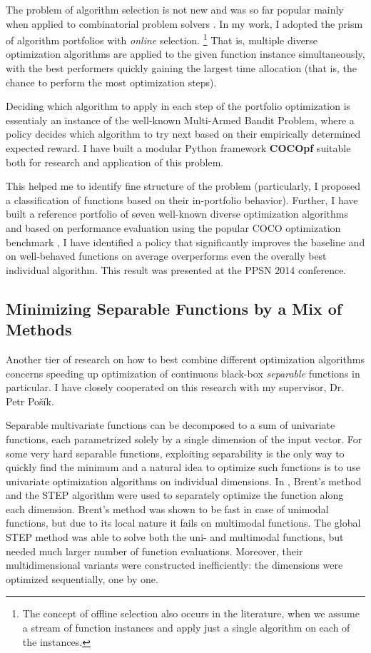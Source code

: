 The problem of algorithm selection is not new \cite{Rice}
and was so far popular mainly when applied to
combinatorial problem solvers \cite{combpfsurvey}.
In my work, I adopted the prism of algorithm portfolios \cite{algportfolios}
with \textit{online} selection.%
\footnote{The concept of offline selection also occurs in the literature,
	when we assume a stream of function instances and apply just a single
	algorithm on each of the instances.}
That is, multiple diverse optimization algorithms are applied
to the given function instance simultaneously, with the best
performers quickly gaining the largest time allocation (that is,
the chance to perform the most optimization steps).

Deciding which algorithm to apply in each step of the portfolio
optimization is essentialy an instance of the well-known Multi-Armed
Bandit Problem, where a policy decides which algorithm to try next
based on their empirically determined expected reward.
I have built a modular Python framework \textbf{COCOpf} \cite{COCOpf}
suitable both for research and application of this problem.

This helped me to identify fine structure of the problem
(particularly, I proposed a classification of functions based on
their in-portfolio behavior).
Further, I have built a reference portfolio of seven well-known
diverse optimization algorithms and based on performance evaluation
using the popular COCO optimization benchmark \cite{COCO1}, I have
identified a policy that significantly improves the baseline and
on well-behaved functions on average overperforms even the overally
best individual algorithm. This result was presented at the
PPSN 2014 conference. \cite{optpf}

\subsection{Minimizing Separable Functions by a Mix of Methods}

Another tier of research on how to best combine different optimization
algorithms concerns speeding up optimization of continuous black-box
\textit{separable} functions in particular.  I have closely cooperated
on this research with my supervisor, Dr. Petr Pošík.

Separable multivariate functions can be decomposed to a sum of univariate
functions, each parametrized solely by a single dimension of the input
vector.
For some very hard separable functions, exploiting separability
is the only way to quickly find the minimum and a natural idea to optimize
such functions is to use univariate optimization algorithms on individual
dimensions.
In \cite{PosikGECCO2009LineSearch}, Brent's method \cite{Brent1973} and the STEP algorithm \cite{STEP} were used to separately optimize the function along each dimension.
Brent's method was shown to be fast in case of unimodal functions, but due to its local nature it fails on multimodal functions.
The global STEP method was able to solve both the uni- and multimodal functions, but needed much larger number of function evaluations.
Moreover, their multidimensional variants were constructed inefficiently: the dimensions were optimized sequentially, one by one.

